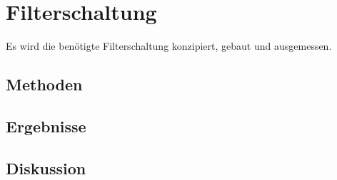 \section{Filterschaltung}
Es wird die benötigte Filterschaltung konzipiert, gebaut und ausgemessen.

\subsection{Methoden}

\subsection{Ergebnisse}

\subsection{Diskussion}



